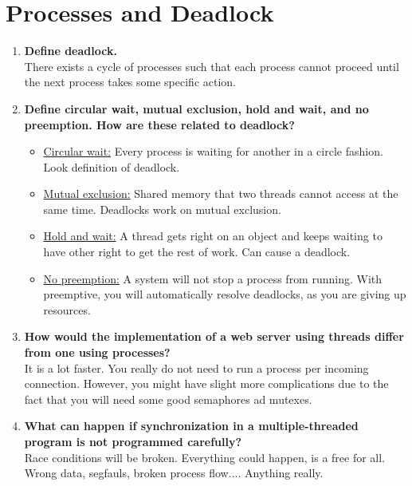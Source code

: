 \documentclass[a4paper]{article}
\begin{document}
\section{Processes and Deadlock} %
\label{sec:Processes and Deadlock}
\begin{enumerate}
  \item {\bf Define deadlock. }\\
    There exists a cycle of processes such that each process cannot proceed until the next process takes some specific action.

  \item {\bf Define circular wait, mutual exclusion, hold and wait, and no preemption. How are these related to deadlock? }\\
    \begin{itemize}
      \item \underline{Circular wait:} Every process is waiting for another in a circle fashion. Look definition of deadlock. 
      \item \underline{Mutual exclusion:} Shared memory that two threads cannot access at the same time. Deadlocks work on mutual exclusion.
      \item \underline{Hold and wait:} A thread gets right on an object and keeps waiting to have other right to get the rest of work. Can cause a deadlock.
      \item \underline{No preemption:} A system will not stop a process from running. With preemptive, you will automatically resolve deadlocks, as you are giving up resources. 
    \end{itemize}

  \item {\bf How would the implementation of a web server using threads differ from one using processes? }\\
    It is a lot faster. You really do not need to run a process per incoming connection. However, you might have slight more complications due to the fact that you will need some good semaphores ad mutexes.

  \item {\bf What can happen if synchronization in a multiple-threaded program is not programmed carefully? } \\
    Race conditions will be broken. Everything could happen, is a free for all. Wrong data, segfauls, broken process flow$\dots$. Anything really.


\end{enumerate}
\end{document}
